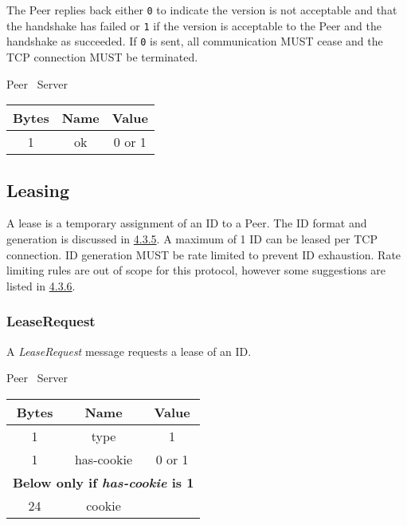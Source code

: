 The Peer replies back either \texttt{0} to indicate the version is not acceptable and that the handshake has
failed or \texttt{1} if the version is acceptable to the Peer and the handshake as succeeded. If \texttt{0} is sent, all
communication MUST cease and the TCP connection MUST be terminated.

\begin{center}
    Peer \textrightarrow\ Server\\
    \begin{tabular}{|c|c|c|}
        \hline
        \textbf{Bytes} & \textbf{Name} & \textbf{Value} \\
        \hline
        1              & ok            & 0 or 1         \\
        \hline
    \end{tabular}
\end{center}

\subsection{Leasing}

A lease is a temporary assignment of an ID to a Peer. The ID format and generation is discussed in
\hyperlink{subsubsection.4.3.5}{4.3.5}. A maximum of 1 ID can be leased per TCP connection. ID generation MUST be
rate limited to prevent ID exhaustion. Rate limiting rules are out of scope for this protocol, however some
suggestions are listed in \hyperlink{subsubsection.4.3.6}{4.3.6}.

\subsubsection{LeaseRequest}

A \emph{LeaseRequest} message requests a lease of an ID.

\begin{center}
    Peer \textrightarrow\ Server\\
    \begin{tabular}{|c|c|c|}
        \hline
        \textbf{Bytes} & \textbf{Name} & \textbf{Value} \\
        \hline
        1              & type          & 1              \\
        \hline
        1              & has-cookie    & 0 or 1         \\
        \hline
        \multicolumn{3}{|c|}{\textbf{Below only if \emph{has-cookie} is 1} } \\
        \hline
        24             & cookie        &                \\
        \hline
    \end{tabular}
\end{center}


